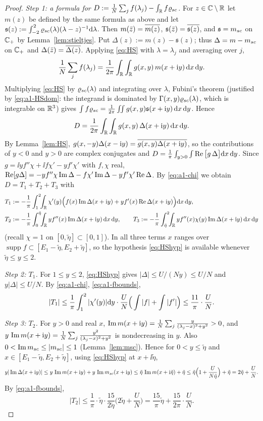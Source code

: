 \begin{proof}
\emph{Step 1: a formula for $D:=\frac1N\sum_jf(\lambda_j)-\int_{\mathbb{R}} f\varrho_{sc}$.} For $z\in\mathbb{C}\setminus\mathbb{R}$ let $m(z)$ be defined by the same formula as above and let $\mathfrak s(z):=\int_{-2}^2\varrho_{sc}(\lambda)(\lambda-z)^{-1}\mathrm{d}\lambda$. Then $m(\bar z)=\overline{m(z)}$, $\mathfrak s(\bar z)=\overline{\mathfrak s(z)}$,
and $\mathfrak s=m_{sc}$ on $\mathbb{C}_+$ by Lemma~\ref{lem:stieltjes}. Put $\Delta(z):=m(z)-\mathfrak s(z)$; thus $\Delta=m-m_{sc}$ on $\mathbb{C}_+$ and $\Delta(\bar z)=\overline{\Delta(z)}$.
Applying \eqref{eq:HS} with $\lambda=\lambda_j$ and averaging over $j$,
\[
 \frac1N\sum_jf(\lambda_j)=\frac1{2\pi}\int_{\mathbb{R}}\int_{\mathbb{R}} g(x,y)\,m(x+\mathrm{i} y)\,\mathrm{d} x\,\mathrm{d} y .
\]
Multiplying \eqref{eq:HS} by $\varrho_{sc}(\lambda)$ and integrating over $\lambda$, Fubini's theorem (justified by \eqref{eq:a1-HSdom}: the integrand is dominated by $\Gamma(x,y)\varrho_{sc}(\lambda)$, which is integrable on $\mathbb{R}^3$) gives
$\int f\varrho_{sc}=\frac1{2\pi}\int\!\!\int g(x,y)\mathfrak s(x+\mathrm{i} y)\,\mathrm{d} x\,\mathrm{d} y$. Hence
\[
 D=\frac1{2\pi}\int_{\mathbb{R}}\int_{\mathbb{R}} g(x,y)\,\Delta(x+\mathrm{i} y)\,\mathrm{d} x\,\mathrm{d} y .
\]
By Lemma~\ref{lem:HS}, $g(x,-y)\Delta(x-\mathrm{i} y)=\overline{g(x,y)\Delta(x+\mathrm{i} y)}$, so the contributions of $y<0$ and $y>0$ are complex conjugates and $D=\frac1\pi\int_{y>0}\int\operatorname{Re}\big[g\,\Delta\big]\mathrm{d} x\,\mathrm{d} y$.
Since $g=\ii yf''\chi+\ii f\chi'-yf'\chi'$ with $f,\chi$ real, $\operatorname{Re}[g\Delta]=-yf''\chi\operatorname{Im}\Delta-f\chi'\operatorname{Im}\Delta-yf'\chi'\operatorname{Re}\Delta$. By \eqref{eq:a1-chi} we obtain $D=T_1+T_2+T_3$ with
\begin{align*}
 T_1&:=-\frac1\pi\int_1^2\!\!\int_{\mathbb{R}}\chi'(y)\Big(f(x)\operatorname{Im}\Delta(x+\mathrm{i} y)+yf'(x)\operatorname{Re}\Delta(x+\mathrm{i} y)\Big)\mathrm{d} x\,\mathrm{d} y,\\
 T_2&:=-\frac1\pi\int_0^{\tilde\eta}\!\!\int_{\mathbb{R}} yf''(x)\operatorname{Im}\Delta(x+\mathrm{i} y)\,\mathrm{d} x\,\mathrm{d} y,\qquad
 T_3:=-\frac1\pi\int_{\tilde\eta}^2\!\!\int_{\mathbb{R}} yf''(x)\chi(y)\operatorname{Im}\Delta(x+\mathrm{i} y)\,\mathrm{d} x\,\mathrm{d} y
\end{align*}
(recall $\chi=1$ on $[0,\tilde\eta]\subset[0,1]$). In all three terms $x$ ranges over $\operatorname{supp}f\subset[E_1-\tilde\eta,E_2+\tilde\eta]$, so the hypothesis \eqref{eq:HShyp} is available whenever $\tilde\eta\le y\le2$.

\emph{Step 2: $T_1$.} For $1\le y\le2$, \eqref{eq:HShyp} gives $|\Delta|\le U/(Ny)\le U/N$ and $y|\Delta|\le U/N$. By \eqref{eq:a1-chi}, \eqref{eq:a1-fbounds},
\[
 |T_1|\le\frac1\pi\int_1^2|\chi'(y)|\mathrm{d} y\cdot\frac UN\Big(\int|f|+\int|f'|\Big)\le\frac{11}{\pi}\cdot\frac UN .
\]

\emph{Step 3: $T_2$.} For $y>0$ and real $x$, $\operatorname{Im} m(x+\mathrm{i} y)=\frac1N\sum_j\frac{y}{(\lambda_j-x)^2+y^2}>0$, and $y\,\operatorname{Im} m(x+\mathrm{i} y)=\frac1N\sum_j\frac{y^2}{(\lambda_j-x)^2+y^2}$ is nondecreasing in $y$. Also $0<\operatorname{Im}m_{sc}\le|m_{sc}|\le1$ (Lemma~\ref{lem:msc}).
Hence for $0<y\le\tilde\eta$ and $x\in[E_1-\tilde\eta,E_2+\tilde\eta]$, using \eqref{eq:HShyp} at $x+\ii\tilde\eta$,
\[
 y|\operatorname{Im}\Delta(x+\mathrm{i} y)|\le y\,\operatorname{Im} m(x+\mathrm{i} y)+y\,\operatorname{Im}m_{sc}(x+\mathrm{i} y)\le\tilde\eta\,\operatorname{Im} m(x+\mathrm{i}\tilde\eta)+\tilde\eta\le\tilde\eta\Big(1+\frac{U}{N\tilde\eta}\Big)+\tilde\eta=2\tilde\eta+\frac UN .
\]
By \eqref{eq:a1-fbounds},
\[
 |T_2|\le\frac1\pi\cdot\tilde\eta\cdot\frac{15}{2\tilde\eta}\Big(2\tilde\eta+\frac UN\Big)=\frac{15}{\pi}\tilde\eta+\frac{15}{2\pi}\cdot\frac UN .
\]


\end{proof}
